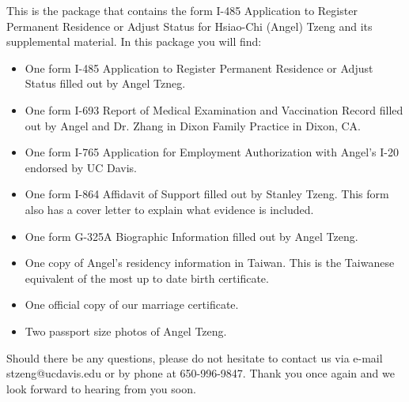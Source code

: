 \documentclass[stdletter]{newlfm}
\begin{document}
 
\begin{newlfm}
This is the package that contains the form I-485 Application to Register Permanent Residence or Adjust Status for Hsiao-Chi (Angel) Tzeng and its supplemental material.  In this package you will find:
\begin{itemize}

\item One form I-485 Application to Register Permanent Residence or Adjust Status filled out by Angel Tzneg.
\item One form I-693 Report of Medical Examination and Vaccination Record filled out by Angel and Dr. Zhang in Dixon Family Practice in Dixon, CA.
\item One form I-765 Application for Employment Authorization with Angel's I-20 endorsed by UC Davis.  
\item One form I-864 Affidavit of Support filled out by Stanley Tzeng.  This form also has a cover letter to explain what evidence is included.
\item One form G-325A Biographic Information filled out by Angel Tzeng.
\item One copy of Angel's residency information in Taiwan.  This is the Taiwanese equivalent of the most up to date birth certificate.
\item One official copy of our marriage certificate.
\item Two passport size photos of Angel Tzeng.



\end{itemize}

Should there be any questions, please do not hesitate to contact us via e-mail stzeng@ucdavis.edu or by phone at 650-996-9847.  Thank you once again and we look forward to hearing from you soon.
\end{newlfm}
\end{document}
